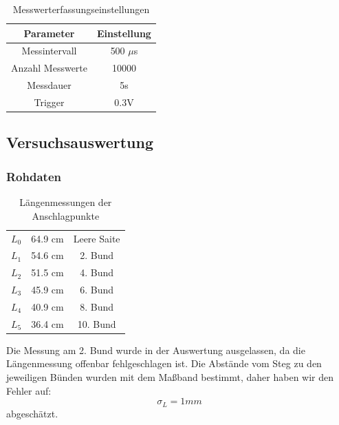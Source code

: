 \documentclass[12pt,a4paper]{article}
\begin{document}
\begin{table}[H]\centering
\caption{Messwerterfassungseinstellungen}
\begin{tabular}{c|c}
Parameter & Einstellung \\ 
\hline
Messintervall & 500 $\mu$s \\ 
Anzahl Messwerte & 10000 \\ 
Messdauer & 5s \\ 
Trigger & 0.3V \\ 
\end{tabular} 
\end{table}

\subsection{Versuchsauswertung}

\subsubsection{Rohdaten}
\begin{table}[H]\centering
\caption{Längenmessungen der Anschlagpunkte}
\begin{tabular}{c|c|c}
$L_0$ & 64.9 cm & Leere Saite\\ 
$L_1$ & 54.6 cm & 2. Bund \\ 
$L_2$ & 51.5 cm & 4. Bund \\ 
$L_3$ & 45.9 cm & 6. Bund \\ 
$L_4$ & 40.9 cm & 8. Bund \\ 
$L_5$ & 36.4 cm & 10. Bund \\ 
\end{tabular} 
\end{table}
Die Messung am 2. Bund wurde in der Auswertung ausgelassen, da die Längenmessung offenbar fehlgeschlagen ist. Die Abstände vom Steg zu den jeweiligen Bünden wurden mit dem Maßband bestimmt, daher haben wir den Fehler auf:
\begin{equation*}
\sigma_L=1 mm
\end{equation*}
abgeschätzt.
\end{document}
